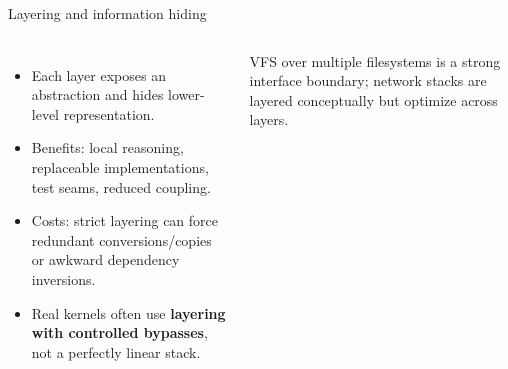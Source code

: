 \documentclass[aspectratio=169,11pt]{beamer}
\newcommand{\concept}[1]{\textcolor{osblue}{\textbf{#1}}}
\begin{document}
\begin{frame}{Layering and information hiding}
  \small
  \begin{columns}[T,onlytextwidth]
      \centering
      \begin{itemize}
        \item Each layer exposes an abstraction and hides lower-level representation.
        \item Benefits: local reasoning, replaceable implementations, test seams, reduced coupling.
        \item Costs: strict layering can force redundant conversions/copies or awkward dependency inversions.
        \item Real kernels often use \concept{layering with controlled bypasses}, not a perfectly linear stack.
      \end{itemize}
      \begin{tcolorbox}[title=Examples]
        VFS over multiple filesystems is a strong interface boundary; network stacks are layered conceptually but optimize across layers.
      \end{tcolorbox}
  \end{columns}
\end{frame}
\end{document}

